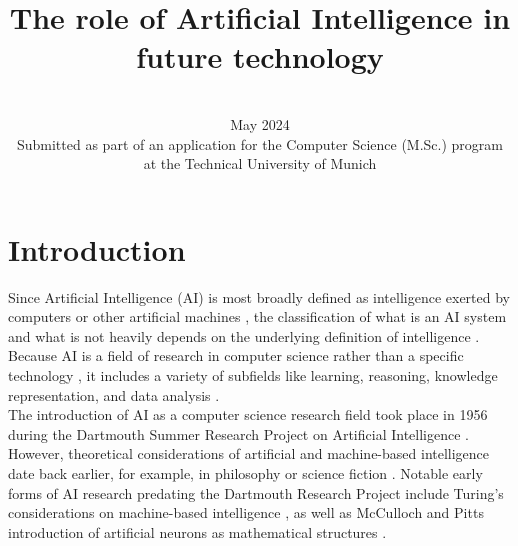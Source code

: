 \documentclass[a4paper, conference]{IEEEtran}
\begin{document}
\title{\LARGE The role of Artificial Intelligence in future technology}

\author{ \\ May 2024 \\ \small Submitted as part of an application for the Computer Science (M.Sc.) program \\ at the Technical University of Munich}

\maketitle


\IEEEoverridecommandlockouts
\IEEEpeerreviewmaketitle

\section{Introduction}
Since Artificial Intelligence (AI) is most broadly defined as intelligence exerted by computers or other artificial machines \cite[p. 29]{aiModernApproach}, the classification of what is an AI system and what is not heavily depends on the underlying definition of intelligence \cite[p. 31]{aiModernApproach}. Because AI is a field of research in computer science rather than a specific technology \cite[p. 1]{aiStructuresStrategies}, it includes a variety of subfields like learning, reasoning, knowledge representation, and data analysis \cite[pp. 20-30]{aiStructuresStrategies}.\\

The introduction of AI as a computer science research field took place in 1956 during the Dartmouth Summer Research Project on Artificial Intelligence \cite{dartmouthFiftyYears}. However, theoretical considerations of artificial and machine-based intelligence date back earlier, for example, in philosophy \cite[pp. 5-6]{Flasiński2016} or science fiction \cite[pp. 29-40]{riseOfSelfReplicators}. Notable early forms of AI research predating the Dartmouth Research Project include Turing's considerations on machine-based intelligence \cite{Turing1950ComputingMA}, as well as McCulloch and Pitts introduction of artificial neurons as mathematical structures \cite{mcculloch43a}.\\
\end{document}
